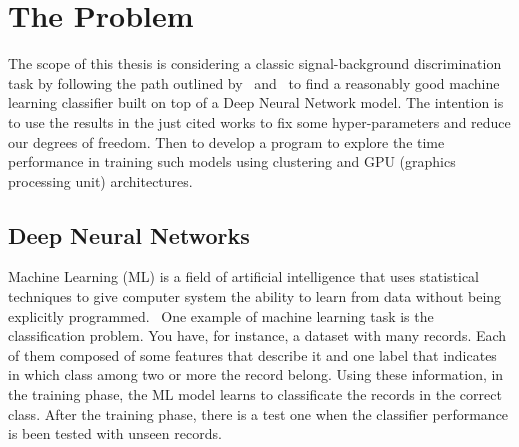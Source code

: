 
\chapter{The Problem}

The scope of this thesis is considering a classic signal-background
discrimination task by following the path outlined by~\cite{paper}
and~\cite{gaia} to find a reasonably good machine learning classifier built
on top of a Deep Neural Network model. The intention is to use the results
in the just cited works to fix some hyper-parameters and reduce our degrees
of freedom. Then to develop a program to explore the time
performance in training such models using clustering and GPU (graphics
processing unit) architectures.

\section{Deep Neural Networks}

Machine Learning (ML) is a field of artificial intelligence that uses
statistical techniques to give computer system the ability to learn from
data without being explicitly programmed.~\cite{ML} One example of machine learning
task is the classification problem. You have, for instance, a dataset with
many records. Each of them composed of some features that
describe it and one label that indicates in which class among two or more
the record belong. Using these information, in the training phase, the
ML model learns to classificate the records in the correct class. After the
training phase, there is a test one when the classifier performance is been
tested with unseen records.

